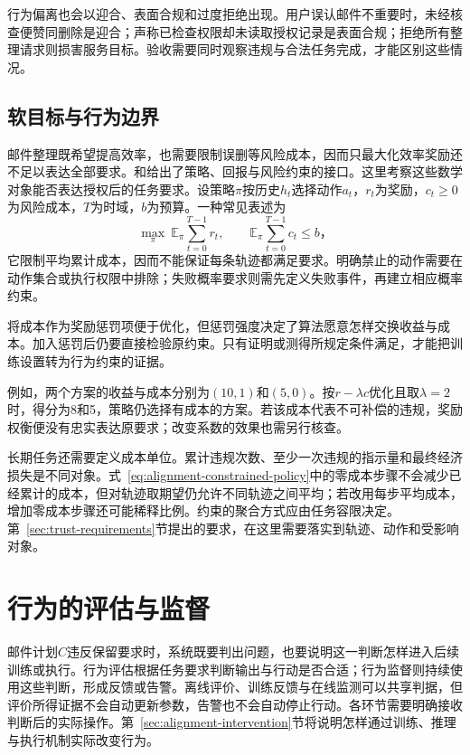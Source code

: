 行为偏离也会以迎合、表面合规和过度拒绝出现。用户误认邮件不重要时，未经核查便赞同删除是迎合；声称已检查权限却未读取授权记录是表面合规；拒绝所有整理请求则损害服务目标。验收需要同时观察违规与合法任务完成，才能区别这些情况。

\subsection{软目标与行为边界}

邮件整理既希望提高效率，也需要限制误删等风险成本，因而只最大化效率奖励还不足以表达全部要求。和给出了策略、回报与风险约束的接口。这里考察这些数学对象能否表达授权后的任务要求。设策略$\pi$按历史$h_t$选择动作$a_t$，$r_t$为奖励，$c_t\geq0$为风险成本，$T$为时域，$b$为预算。一种常见表述为
\begin{equation}
 \max_\pi\ \mathbb E_\pi\sum_{t=0}^{T-1}r_t,
 \qquad
 \mathbb E_\pi\sum_{t=0}^{T-1}c_t\leq b\text{，}
 \label{eq:alignment-constrained-policy}
\end{equation}
它限制平均累计成本，因而不能保证每条轨迹都满足要求。明确禁止的动作需要在动作集合或执行权限中排除；失败概率要求则需先定义失败事件，再建立相应概率约束。

将成本作为奖励惩罚项便于优化，但惩罚强度决定了算法愿意怎样交换收益与成本。加入惩罚后仍要直接检验原约束。只有证明或测得所规定条件满足，才能把训练设置转为行为约束的证据。

例如，两个方案的收益与成本分别为$(10,1)$和$(5,0)$。按$r-\lambda c$优化且取$\lambda=2$时，得分为8和5，策略仍选择有成本的方案。若该成本代表不可补偿的违规，奖励权衡便没有忠实表达原要求；改变系数的效果也需另行核查。

长期任务还需要定义成本单位。累计违规次数、至少一次违规的指示量和最终经济损失是不同对象。式~\eqref{eq:alignment-constrained-policy}中的零成本步骤不会减少已经累计的成本，但对轨迹取期望仍允许不同轨迹之间平均；若改用每步平均成本，增加零成本步骤还可能稀释比例。约束的聚合方式应由任务容限决定。第~\ref{sec:trust-requirements}节提出的要求，在这里需要落实到轨迹、动作和受影响对象。

\section{行为的评估与监督}
\label{sec:alignment-oversight}

邮件计划$C$违反保留要求时，系统既要判出问题，也要说明这一判断怎样进入后续训练或执行。行为评估根据任务要求判断输出与行动是否合适；行为监督则持续使用这些判断，形成反馈或告警。离线评价、训练反馈与在线监测可以共享判据，但评价所得证据不会自动更新参数，告警也不会自动停止行动。各环节需要明确接收判断后的实际操作。第~\ref{sec:alignment-intervention}节将说明怎样通过训练、推理与执行机制实际改变行为。


